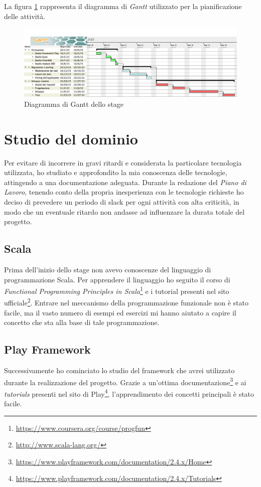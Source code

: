 La figura \ref{fig:ScreenShot2016-01-06at17} rappresenta il diagramma di \textit{Gantt} utilizzato per la pianificazione delle attività.
\begin{figure}[h]
\centering
\includegraphics[width=1.2\linewidth, height=0.45\textheight]{"immagini/piano-di-lavoro"}
\caption[Diagramma di Gantt dello stage]{Diagramma di Gantt dello stage}
\label{fig:ScreenShot2016-01-06at17}
\end{figure}


\newpage
\section{Studio del dominio}
Per evitare di incorrere in gravi ritardi e considerata la particolare tecnologia utilizzata, ho studiato e approfondito la mia conoscenza delle tecnologie, attingendo a una documentazione adeguata. Durante la redazione del \textit{Piano di Lavoro}, tenendo conto della propria inesperienza con le tecnologie richieste ho deciso di prevedere un periodo di \gls{slack} per ogni attività con alta criticità, in modo che un eventuale ritardo non andasse ad influenzare la durata totale del progetto.


\subsection*{Scala}
Prima dell'inizio dello stage non avevo conoscenze del linguaggio di programmazione Scala. Per apprendere il linguaggio ho seguito il corso di \textit{Functional Programming Principles in Scala}\footnote{\url{https://www.coursera.org/course/progfun}} e i tutorial presenti nel sito ufficiale\footnote{\url{http://www.scala-lang.org/}}. Entrare nel meccanismo della programmazione funzionale non è stato facile, ma il vasto numero di esempi ed esercizi mi hanno aiutato a capire il concetto che sta alla base di tale programmazione.

\subsection*{Play Framework}
Successivamente ho cominciato lo studio del \gls{framework} che avrei utilizzato durante la realizzazione del progetto. Grazie a un'ottima documentazione\footnote{\url{https://www.playframework.com/documentation/2.4.x/Home}} e ai \textit{tutorials} presenti nel sito di Play\footnote{\url{https://www.playframework.com/documentation/2.4.x/Tutorials}}, l'apprendimento dei concetti principali è stato facile.

